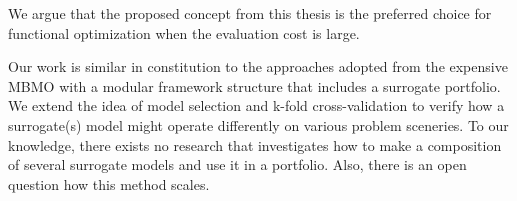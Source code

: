         We argue that the proposed concept from this thesis is the preferred choice for functional optimization when the evaluation cost is large.


        Our work is similar in constitution to the approaches adopted from the expensive MBMO \cite{SoftSurvey} with a modular framework structure that includes a surrogate portfolio. We extend the idea of model selection and k-fold cross-validation to verify how a surrogate(s) model might operate differently on various problem sceneries. To our knowledge, there exists no research that investigates how to make a composition of several surrogate models and use it in a portfolio. Also, there is an open question how this method scales.












